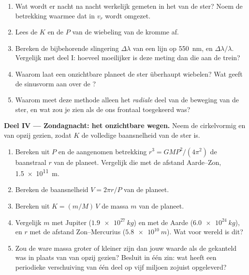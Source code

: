 \begin{problem}
\begin{enumerate}[resume]
  \item Wat wordt er nacht na nacht werkelijk gemeten in het
        \emph{} van de ster? Noem de betrekking waarmee dat in
        $v_r$ wordt omgezet.
  \item Lees de  $K$ en de  $P$ van de wiebeling van de
        kromme af.
  \item Bereken de bijbehorende slingering $\Delta\lambda$ van een lijn op
        \qty{550}{nm}, en $\Delta\lambda/\lambda$. Vergelijk met deel I:
        hoeveel moeilijker is deze meting dan die aan de trein?
  \item Waarom laat een onzichtbare planeet de ster überhaupt wiebelen?
        Wat geeft de sinusvorm aan over de ?
  \item Waarom meet deze methode alleen het \emph{radiale} deel van de
        beweging van de ster, en wat zou je zien als de  ons frontaal
        toegekeerd was?
\end{enumerate}

\medskip
\noindent\textbf{Deel IV --- Zondagnacht: het onzichtbare wegen.}
Neem de  cirkelvormig en van opzij gezien, zodat $K$ de volledige
baansnelheid van de ster is.
\begin{enumerate}[resume]
  \item Bereken uit $P$ en de aangenomen betrekking
        $r^3 = G M P^2/(4\pi^2)$ de baanstraal $r$ van de planeet.
        Vergelijk die met de afstand Aarde--Zon, \qty{1.5e11}{m}.
  \item Bereken de baansnelheid $V = 2\pi r/P$ van de planeet.
  \item Bereken uit $K = (m/M)\,V$ de massa $m$ van de planeet.
  \item Vergelijk $m$ met Jupiter ($\qty{1.9e27}{kg}$) en met de Aarde
        ($\qty{6.0e24}{kg}$), en $r$ met de afstand Zon--Mercurius
        ($\qty{5.8e10}{m}$). Wat voor wereld is dit?
  \item Zou de ware massa groter of kleiner zijn dan jouw waarde als de
         gekanteld was in plaats van van opzij gezien? Besluit in één
        zin: wat heeft een periodieke verschuiving van één deel op vijf
        miljoen zojuist opgeleverd?
\end{enumerate}
\end{problem}
